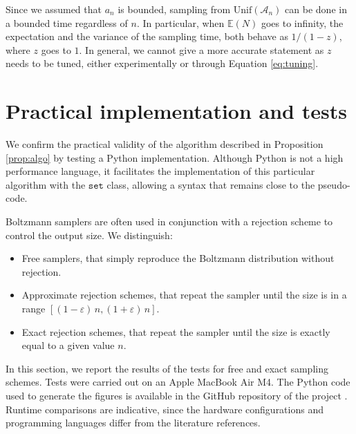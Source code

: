 \documentclass[a4paper,10pt]{article}
\theoremstyle{definition}
\newcommand{\EE}{\mathbb{E}}
\newcommand{\Aa}{\mathcal{A}}
\begin{document}
Since we assumed that $a_n$ is bounded, sampling from $\text{Unif}(\Aa_n)$ can be done in a bounded time regardless of $n$. In particular, when $\EE(N)$ goes to infinity, the expectation and the variance of the sampling time, both behave as $1/(1-z)$, where $z$ goes to $1$. In general, we cannot give a more accurate statement as $z$ needs to be tuned, either experimentally or through Equation \ref{eq:tuning}.
    
\section{Practical implementation and tests}\label{sec:practical}
We confirm the practical validity of the algorithm described in Proposition \ref{prop:algo} by testing a Python implementation. Although Python is not a high performance language, it facilitates the implementation of this particular algorithm with the $\mathtt{set}$ class, allowing a syntax that remains close to the pseudo-code.

Boltzmann samplers are often used in conjunction with a rejection scheme to control the output size.  We distinguish:
\begin{itemize}
    \item Free samplers, that simply reproduce the Boltzmann distribution without rejection.
    \item Approximate rejection schemes, that repeat the sampler until the size is in a range $[(1-\varepsilon)\,n,(1+\varepsilon)\,n]$.
    \item Exact rejection schemes, that repeat the sampler until the size is exactly equal to a given value $n$.
\end{itemize}
In this section, we report the results of the tests for free and exact sampling schemes. Tests were carried out on an Apple MacBook Air M4. The Python code used to generate the figures is available in the GitHub repository of the project \cite{Repo}. Runtime comparisons are indicative, since the hardware configurations and programming languages differ from the literature references.
\end{document}
